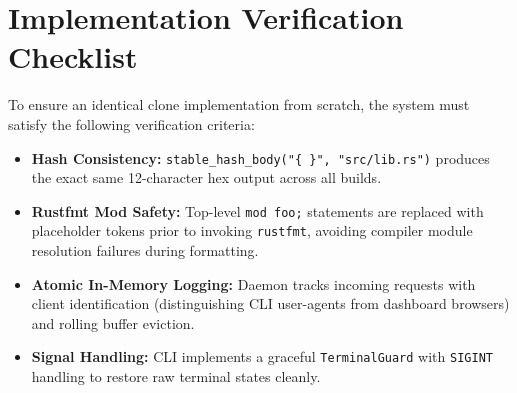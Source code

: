 \documentclass[11pt,a4paper]{article}
\begin{document}
\section{Implementation Verification Checklist}

To ensure an identical clone implementation from scratch, the system must satisfy the following verification criteria:

\begin{itemize}[leftmargin=*]
    \item[$\square$] \textbf{Hash Consistency:} \texttt{stable\_hash\_body("\{ \}", "src/lib.rs")} produces the exact same 12-character hex output across all builds.
    \item[$\square$] \textbf{Rustfmt Mod Safety:} Top-level \texttt{mod foo;} statements are replaced with placeholder tokens prior to invoking \texttt{rustfmt}, avoiding compiler module resolution failures during formatting.
    \item[$\square$] \textbf{Atomic In-Memory Logging:} Daemon tracks incoming requests with client identification (distinguishing CLI user-agents from dashboard browsers) and rolling buffer eviction.
    \item[$\square$] \textbf{Signal Handling:} CLI implements a graceful \texttt{TerminalGuard} with \texttt{SIGINT} handling to restore raw terminal states cleanly.
\end{itemize}
\end{document}
